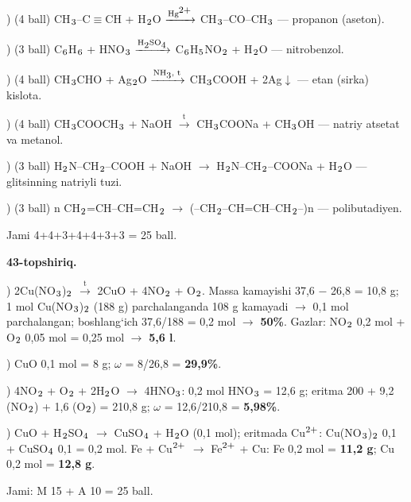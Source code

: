 \documentclass[11pt,a4paper]{article}
\renewcommand{\textsubscript}[1]{\ensuremath{_{\text{\fontsize{8}{8}\selectfont #1}}}}
\renewcommand{\textsuperscript}[1]{\ensuremath{^{\text{\fontsize{8}{8}\selectfont #1}}}}
\begin{document}
) (4 ball) CH\textsubscript{3}--C$\equiv$CH + H\textsubscript{2}O $\xrightarrow{\text{Hg\textsuperscript{2+}}}$ CH\textsubscript{3}--CO--CH\textsubscript{3} --- propanon (aseton).\par
{}) (3 ball) C\textsubscript{6}H\textsubscript{6} + HNO\textsubscript{3} $\xrightarrow{\text{H\textsubscript{2}SO\textsubscript{4}}}$ C\textsubscript{6}H\textsubscript{5}NO\textsubscript{2} + H\textsubscript{2}O --- nitrobenzol.\par
{}) (4 ball) CH\textsubscript{3}CHO + Ag\textsubscript{2}O $\xrightarrow{\text{NH\textsubscript{3}, t}}$ CH\textsubscript{3}COOH + 2Ag$\downarrow$ --- etan (sirka) kislota.\par
{}) (4 ball) CH\textsubscript{3}COOCH\textsubscript{3} + NaOH $\xrightarrow{\text{t}}$ CH\textsubscript{3}COONa + CH\textsubscript{3}OH --- natriy atsetat va metanol.\par
{}) (3 ball) H\textsubscript{2}N--CH\textsubscript{2}--COOH + NaOH $\to$ H\textsubscript{2}N--CH\textsubscript{2}--COONa + H\textsubscript{2}O --- glitsinning natriyli tuzi.\par
{}) (3 ball) n CH\textsubscript{2}=CH--CH=CH\textsubscript{2} $\to$ (--CH\textsubscript{2}--CH=CH--CH\textsubscript{2}--)n --- polibutadiyen.\par
\noindent Jami 4+4+3+4+4+3+3 = 25 ball.\par
\noindent\textbf{43-topshiriq.}\par
{}) 2Cu(NO\textsubscript{3})\textsubscript{2} $\xrightarrow{\text{t}}$ 2CuO + 4NO\textsubscript{2} + O\textsubscript{2}. Massa kamayishi 37,6 $-$ 26,8 = 10,8 g; 1 mol Cu(NO\textsubscript{3})\textsubscript{2} (188 g) parchalanganda 108 g kamayadi $\to$ 0,1 mol parchalangan; boshlang`ich 37,6/188 = 0,2 mol $\to$ \textbf{50\%}. Gazlar: NO\textsubscript{2} 0,2 mol + O\textsubscript{2} 0,05 mol = 0,25 mol $\to$ \textbf{5,6 l}.\par
{}) CuO 0,1 mol = 8 g; $\omega$ = 8/26,8 = \textbf{29,9\%}.\par
{}) 4NO\textsubscript{2} + O\textsubscript{2} + 2H\textsubscript{2}O $\to$ 4HNO\textsubscript{3}: 0,2 mol HNO\textsubscript{3} = 12,6 g; eritma 200 + 9,2 (NO\textsubscript{2}) + 1,6 (O\textsubscript{2}) = 210,8 g; $\omega$ = 12,6/210,8 = \textbf{5,98\%}.\par
{}) CuO + H\textsubscript{2}SO\textsubscript{4} $\to$ CuSO\textsubscript{4} + H\textsubscript{2}O (0,1 mol); eritmada Cu\textsuperscript{2+}: Cu(NO\textsubscript{3})\textsubscript{2} 0,1 + CuSO\textsubscript{4} 0,1 = 0,2 mol. Fe + Cu\textsuperscript{2+} $\to$ Fe\textsuperscript{2+} + Cu: Fe 0,2 mol = \textbf{11,2 g}; Cu 0,2 mol = \textbf{12,8 g}.\par
\noindent Jami: M 15 + A 10 = 25 ball.\par
\end{document}
